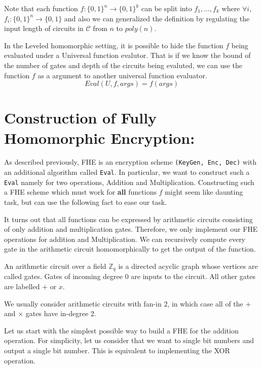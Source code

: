 \documentclass[usletter]{article}
\begin{document}
Note that each function $f:\{0,1\}^n\rightarrow\{0,1\}^k$ can be split into $f_1,\dots,f_k$ where $\forall i$, $f_i:\{0,1\}^n\rightarrow\{0,1\}$ and also we can generalized the definition by regulating the input length of circuits in $\mathcal{C}$ from $n$ to $poly(n)$.



\begin{remark}
	In the Leveled homomorphic setting, it is possible to hide the function $f$ being evaluated under a Universal function evalutor. That is if we know the bound of the number of gates and depth of the circuits being evaluted, we can use the function $f$ as a argument to another universal function evaluator.
	$$Eval(U, f, args) = f(args)$$
\end{remark}

\section{Construction of Fully Homomorphic Encryption:}
As described previously, FHE is an encryption scheme \texttt{(KeyGen, Enc, Dec)} 
with an additional algorithm called \texttt{Eval}. In particular, we want to construct 
such a \texttt{Eval} namely for two operations, Addition and Multiplication. Constructing 
such a FHE scheme which must work for \textbf{all} functions $f$ might seem like daunting task, 
but can use the following fact to ease our task.
\begin{fact}
It turns out that all functions can be expressed by arithmetic circuits consisting
of only addition and multiplication gates. Therefore, we only implement our FHE operations for 
addition and Multiplication. We can recursively compute every gate  in the arithmetic circuit 
homomorphically to get the output of the function. 
\end{fact}

\begin{definition}
An arithmetic circuit over a field $\mathbb{Z}_q$ is a directed
acyclic graph whose vertices are called gates. Gates of incoming degree $0$ are inputs to
the circuit. All other gates are labelled $+$ or $x$. 
\end{definition}
We usually consider arithmetic circuits with fan-in $2$, in which 
case all of the $+$ and $\times$ gates have in-degree $2$.

Let us start with the simplest possible way to build a FHE for the addition operation. 
For simplicity, let us consider that we want to single bit numbers 
and output a single bit number. This is equivalent to implementing the XOR operation. 
\end{document}
